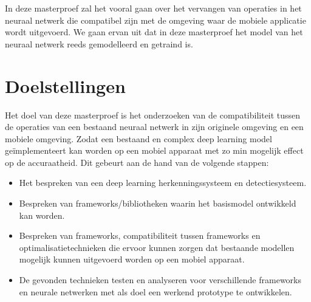 In deze masterproef zal het vooral gaan over het vervangen van operaties in het neuraal netwerk die compatibel zijn met de omgeving waar de mobiele applicatie wordt uitgevoerd.
We gaan ervan uit dat in deze masterproef het model van het neuraal netwerk reeds gemodelleerd en getraind is.


\section{Doelstellingen}
Het doel van deze masterproef is het onderzoeken van de compatibiliteit tussen de operaties van een bestaand neuraal netwerk in zijn originele omgeving en een mobiele omgeving.
Zodat een bestaand en complex deep learning model ge\"implementeert kan worden op een mobiel apparaat met zo min mogelijk effect op de accuraatheid. 
Dit gebeurt aan de hand van de volgende stappen:
\begin{itemize}
    \item Het bespreken van een deep learning herkenningssysteem en detectiesysteem.
    \item Bespreken van frameworks/bibliotheken waarin het basismodel ontwikkeld kan worden.
    \item Bespreken van frameworks, compatibiliteit tussen frameworks en optimalisatietechnieken die ervoor kunnen zorgen dat bestaande modellen mogelijk kunnen uitgevoerd worden op een mobiel apparaat.
    \item De gevonden technieken testen en analyseren voor verschillende frameworks en neurale netwerken met als doel een werkend prototype te ontwikkelen.
\end{itemize}